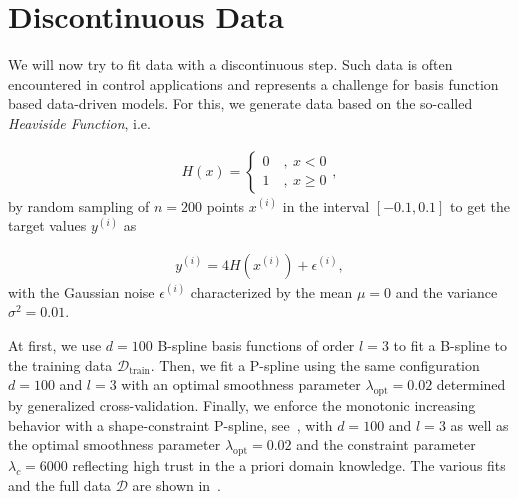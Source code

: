 \section{Discontinuous Data} \label{sec:heaviside}

We will now try to fit data with a discontinuous step. Such data is often encountered in control applications and represents a challenge for basis function based data-driven models. For this, we generate data based on the so-called \emph{Heaviside Function}, i.e.

\begin{align} \label{eq:heaviside}
	H(x) = \begin{cases}
		0 \quad , \ x<0 \\
		1 \quad , \ x \ge 0
	\end{cases},
\end{align}
%
by random sampling of $n=200$ points $x^{(i)}$ in the interval $[-0.1, 0.1]$ to get the target values $y^{(i)}$ as

\begin{align}
	y^{(i)} = 4H(x^{(i)}) + \epsilon^{(i)},
\end{align}
%
with the Gaussian noise $\epsilon^{(i)}$ characterized by the mean $\mu = 0$ and the variance $\sigma^2 = 0.01$.

At first, we use $d=100$ B-spline basis functions of order $l=3$ to fit a B-spline to the training data $\mathcal{D}_{\mathrm{train}}$. Then, we fit a P-spline using the same configuration $d=100$ and $l=3$ with an optimal smoothness parameter $\lambda_{\mathrm{opt}} = 0.02$ determined by generalized cross-validation. Finally, we enforce the monotonic increasing behavior with a shape-constraint P-spline, see~, with $d=100$ and $l=3$ as well as the optimal smoothness parameter $\lambda_{\mathrm{opt}}=0.02$ and the constraint parameter $\lambda_c=6000$ reflecting high trust in the a priori domain knowledge. The various fits and the full data $\mathcal D$ are shown in~.

